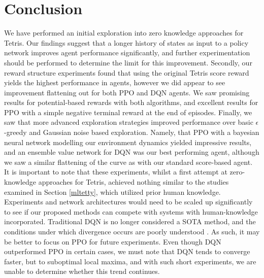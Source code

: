 \documentclass[12pt]{article}
\begin{document}
\section{Conclusion}\label{conclusion}
We have performed an initial exploration into zero knowledge approaches for Tetris. Our findings suggest that a longer history of states as input to a policy network improves agent performance significantly, and further experimentation should be performed to determine the limit for this improvement. Secondly, our reward structure experiments found that using the original Tetris score reward yields the highest performance in agents, however we did appear to see improvement flattening out for both PPO and DQN agents. We saw promising results for potential-based rewards with both algorithms, and excellent results for PPO with a simple negative terminal reward at the end of episodes. Finally, we saw that more advanced exploration strategies improved performance over basic $\epsilon$-greedy and Gaussian noise based exploration. Namely, that PPO with a bayesian neural network modelling our environment dynamics yielded impressive results, and  an ensemble value network for DQN was our best performing agent, although we saw a similar flattening of the curve as with our standard score-based agent.\\\newline
It is important to note that these experiments, whilst a first attempt at zero-knowledge approaches for Tetris, achieved nothing similar to the studies examined in Section \ref{mltetty}, which utilized prior human knowledge. Experiments and network architectures would need to be scaled up significantly to see if our proposed methods can compete with systems with human-knowledge incorporated. Traditional DQN is no longer considered a SOTA method, and the conditions under which divergence occurs are poorly understood \autocite{pmlr-v97-fu19a,achiam2019towards}. As such, it may be better to focus on PPO for future experiments. Even though DQN outperformed PPO in certain cases, we must note that DQN tends to converge faster, but to suboptimal local maxima, and with such short experiments, we are unable to determine whether this trend continues. \\\newline
\end{document}

